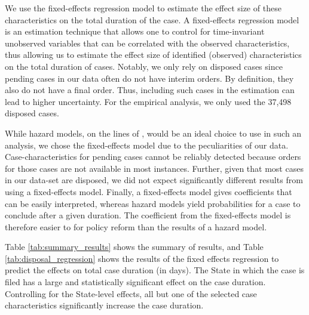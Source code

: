 We use the fixed-effects regression model to estimate the effect size of these characteristics on the total duration of the case. A fixed-effects regression model is an estimation technique that allows one to control for time-invariant unobserved variables that can be correlated with the observed characteristics, thus allowing us to estimate the effect size of identified (observed) characteristics on the total duration of cases. Notably, we only rely on disposed cases since pending cases in our data often do not have interim orders. By definition, they also do not have a final order. Thus, including such cases in the estimation can lead to higher uncertainty. For the empirical analysis, we only used the 37,498 disposed cases. 

While hazard models, on the lines of \textcite{datta2017_itatDelays}, would be an ideal choice to use in such an analysis, we chose the fixed-effects model due to the peculiarities of our data. Case-characteristics for pending cases cannot be reliably detected because orders for those cases are not available in most instances. Further, given that most cases in our data-set are disposed, we did not expect significantly different results from using a fixed-effects model. Finally, a fixed-effects model gives coefficients that can be easily interpreted, whereas hazard models yield probabilities for a case to conclude after a given duration. The coefficient from the fixed-effects model is therefore easier to for policy reform than the results of a hazard model.

Table \ref{tab:summary_results} shows the summary of results, and Table \ref{tab:disposal_regression} shows the results of the fixed effects regression to predict the effects on total case duration (in days). The State in which the case is filed has a large and statistically significant effect on the case duration. Controlling for the State-level effects, all but one of the selected case characteristics significantly increase the case duration.

